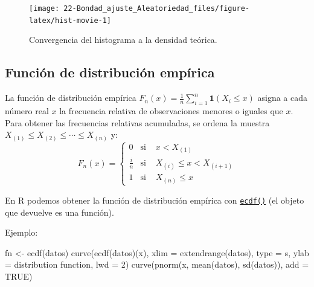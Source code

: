 \documentclass[
  10pt,
]{book}
\newenvironment{Shaded}{\begin{snugshade}}{\end{snugshade}}
\newcommand{\AttributeTok}[1]{\textcolor[rgb]{0.77,0.63,0.00}{#1}}
\newcommand{\ConstantTok}[1]{\textcolor[rgb]{0.00,0.00,0.00}{#1}}
\newcommand{\DecValTok}[1]{\textcolor[rgb]{0.00,0.00,0.81}{#1}}
\newcommand{\FunctionTok}[1]{\textcolor[rgb]{0.00,0.00,0.00}{#1}}
\newcommand{\NormalTok}[1]{#1}
\newcommand{\OtherTok}[1]{\textcolor[rgb]{0.56,0.35,0.01}{#1}}
\newcommand{\StringTok}[1]{\textcolor[rgb]{0.31,0.60,0.02}{#1}}
\renewcommand{\mathbf}[1]{\symbf{#1}}
\theoremstyle{break}
\theoremstyle{nonumberplain}
\begin{document}
\begin{figure}[!htbp]

{\centering \texttt{[image: 22-Bondad\_ajuste\_Aleatoriedad\_files/figure-latex/hist-movie-1]} 

}

\caption{Convergencia del histograma a la densidad teórica.}\label{fig:hist-movie}
\end{figure}

\hypertarget{empdistr}{%
\subsection{Función de distribución empírica}\label{empdistr}}

La función de distribución empírica \(F_n\left( x \right)=\frac{1}{n}\sum_{i=1}^{n}\mathbf{1}\left( X_i\leq x\right)\) asigna a cada número real \(x\) la frecuencia relativa de observaciones menores o iguales que \(x\).
Para obtener las frecuencias relativas acumuladas, se ordena la muestra \(X_{(1)}\leq X_{(2)}\leq \cdots \leq X_{(n)}\) y:
\[F_n(x)=\left \{
\begin{array}{cll}
0 & \text{si } &x<X_{\left(  1\right)  }\\
\tfrac{i}n & \text{si } & X_{\left(  i\right)  }\leq x<X_{\left(  i+1\right)  }\\
1 & \text{si } & X_{\left(  n\right)  }\leq x
\end{array}
\right.\]

En R podemos obtener la función de distribución empírica con \href{https://rdrr.io/r/stats/ecdf.html}{\texttt{ecdf()}} (el objeto que devuelve es una función).

Ejemplo:

\begin{Shaded}
\begin{Highlighting}[]
\NormalTok{fn }\OtherTok{\textless{}{-}} \FunctionTok{ecdf}\NormalTok{(datos)}
\FunctionTok{curve}\NormalTok{(}\FunctionTok{ecdf}\NormalTok{(datos)(x), }\AttributeTok{xlim =} \FunctionTok{extendrange}\NormalTok{(datos), }\AttributeTok{type =} \StringTok{\textquotesingle{}s\textquotesingle{}}\NormalTok{, }
      \AttributeTok{ylab =} \StringTok{\textquotesingle{}distribution function\textquotesingle{}}\NormalTok{, }\AttributeTok{lwd =} \DecValTok{2}\NormalTok{)}
\FunctionTok{curve}\NormalTok{(}\FunctionTok{pnorm}\NormalTok{(x, }\FunctionTok{mean}\NormalTok{(datos), }\FunctionTok{sd}\NormalTok{(datos)), }\AttributeTok{add =} \ConstantTok{TRUE}\NormalTok{)}
\end{Highlighting}
\end{Shaded}
\end{document}
